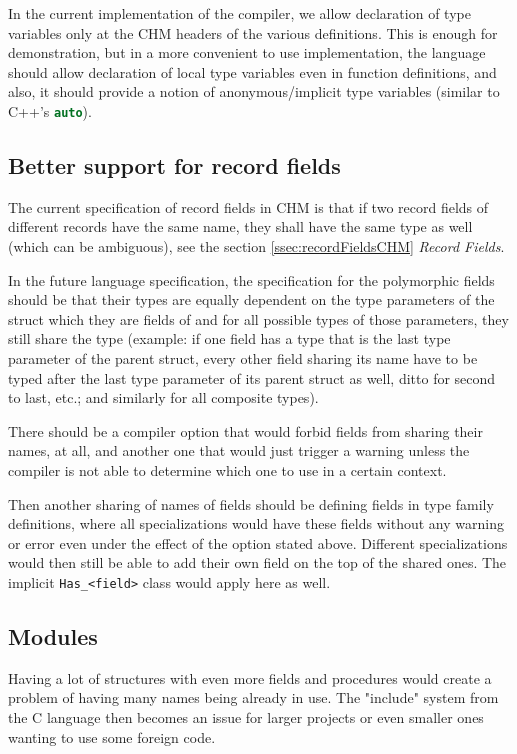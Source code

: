 In the current implementation of the compiler, we allow declaration of type variables only at the CHM headers of the various definitions. This is enough for demonstration, but in a more convenient to use implementation, the language should allow declaration of local type variables even in function definitions, and also, it should provide a notion of anonymous/implicit type variables (similar to C++'s \lstinline[language=c++]{auto}).

\subsection{Better support for record fields}

The current specification of record fields in CHM is that if two record fields of different records have the same name, they shall have the same type as well (which can be ambiguous), see the section \ref{ssec:recordFieldsCHM} \emph{Record Fields}.

In the future language specification, the specification for the polymorphic fields should be that their types are equally dependent on the type parameters of the struct which they are fields of and for all possible types of those parameters, they still share the type (example: if one field has a type that is the last type parameter of the parent struct, every other field sharing its name have to be typed after the last type parameter of its parent struct as well, ditto for second to last, etc.; and similarly for all composite types).

There should be a compiler option that would forbid fields from sharing their names, at all, and another one that would just trigger a warning unless the compiler is not able to determine which one to use in a certain context.

Then another sharing of names of fields should be defining fields in type family definitions, where all specializations would have these fields without any warning or error even under the effect of the option stated above. Different specializations would then still be able to add their own field on the top of the shared ones. The implicit \lstinline{Has_<field>} class would apply here as well.

\subsection{Modules}

Having a lot of structures with even more fields and procedures would create a problem of having many names being already in use. The "include" system from the C language then becomes an issue for larger projects or even smaller ones wanting to use some foreign code.


